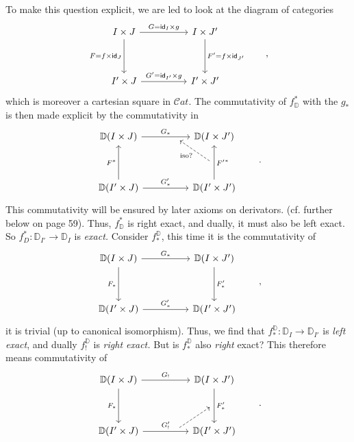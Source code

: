 \documentclass[11pt]{article}
\newcommand{\msp}[1]{\marginpar{\footnotesize [#1]}}
\newcommand{\D}{\mathbb{D}}
\newcommand{\id}{\mathsf{id}}
\newcommand{\Cat}{\mathcal{C}at}
\begin{document}
\msp{page 22: blank}

\msp{page 23}

To make this question explicit, we are led to look at the diagram of categories
\[
\begin{tikzcd}[column sep=huge, row sep=huge]
I \times J \arrow[r, "G = \id_I \times g"] \arrow[d, "F = f \times \id_J"'] & I \times J' \arrow[d, "F' = f \times \id_{J'}"] \\
I' \times J \arrow[r, "G' = \id_{I'} \times g"] & I' \times J'
\end{tikzcd}
\qquad ,
\]
which is moreover a cartesian square in $\Cat$. The commutativity of $f^*_{\D}$ with the $g_*$ is then made explicit by the commutativity in
\[
\begin{tikzcd}[column sep=huge, row sep=huge]
\D(I \times J) \arrow[r, "G_*", ""{name=T, below, near end}] & \D(I \times J') \\
\D(I' \times J) \arrow[u, "F^*"] \arrow[r, "G'_*"] & \D(I' \times J') \arrow[u, "{F'}^*"', ""{name=R, left}]
\arrow[dashed, from=R, to=T, "\text{iso?}"]
\end{tikzcd}
\qquad .
\]
This commutativity will be ensured by later axioms on derivators. (cf. further %
below on page 59). Thus, $f^*_{\D}$ is right exact, and dually, it must also be left exact. So $f^*_D : \D_{I'} \to \D_I$ is \textit{exact.} Consider $f^{\D}_*$, %
this time it is the commutativity of
\[
\begin{tikzcd}[column sep=huge, row sep=huge]
\D(I \times J) \arrow[r, "G_*"] \arrow[d, "F_*"'] & \D(I \times J') \arrow[d, "F'_*"] \\
\D(I' \times J) \arrow[r, "G'_*"] & \D(I' \times J')
\end{tikzcd}
\qquad ,
\]
it is trivial (up to canonical isomorphism). Thus, we
\msp{page 24}
find that $f^{\D}_* : \D_I \to \D_{I'}$ is \textit{left exact}, and dually $f^{\D}_!$ is \textit{right exact.} But is $f^{\D}_*$ also \textit{right} exact? This therefore means commutativity of
\[
\begin{tikzcd}[column sep=huge, row sep=huge]
\D(I \times J) \arrow[r, "G_!"] \arrow[d, "F_*"'] & \D(I \times J') \arrow[d, "F'_*", ""{name=R2, left}] \\
\D(I' \times J) \arrow[r, "G'_!", ""{name=B, above, near end}] & \D(I' \times J')
\arrow[dashed, from=B, to=R2]
\end{tikzcd}
\qquad .
\]
\end{document}
